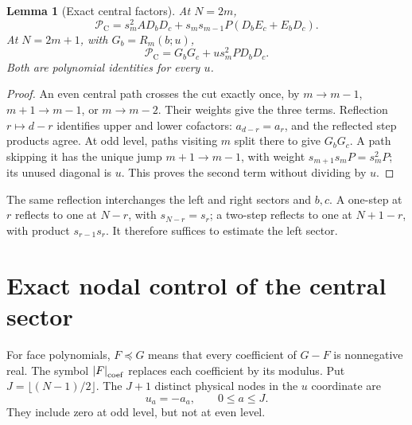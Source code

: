\documentclass[11pt]{article}
\numberwithin{equation}{section}
\newtheorem{lemma}[theorem]{Lemma}
\theoremstyle{remark}\newtheorem{remark}[theorem]{Remark}
\newcommand{\coefle}{\preccurlyeq}
\newcommand{\abscoef}[1]{\left|#1\right|_{\rm coef}}
\begin{document}
\begin{lemma}[Exact central factors]\label{lc:central-factors}
At \(N=2m\),
\begin{equation}\label{lc:even-factor}
 \mathcal P_{\mathrm C}
 =s_m^2A D_bD_c+s_ms_{m-1}P(D_bE_c+E_bD_c).
\end{equation}
At \(N=2m+1\), with \(G_b=R_m(b;u)\),
\begin{equation}\label{lc:odd-factor}
 \mathcal P_{\mathrm C}=G_bG_c+u s_m^2P D_bD_c.
\end{equation}
Both are polynomial identities for every \(u\).
\end{lemma}
\begin{proof}
An even central path crosses the cut exactly once, by \(m\to m-1\),
\(m+1\to m-1\), or \(m\to m-2\). Their weights give the three
terms. Reflection \(r\mapsto d-r\) identifies upper and lower
cofactors: \(a_{d-r}=a_r\), and the reflected step products agree.
At odd level, paths visiting \(m\) split there to give \(G_bG_c\).
A path skipping it has the unique jump \(m+1\to m-1\), with weight
\(s_{m+1}s_mP=s_m^2P\); its unused diagonal is \(u\).
This proves the second term without dividing by \(u\).
\end{proof}

The same reflection interchanges the left and right sectors and \(b,c\).
A one-step at \(r\) reflects to one at \(N-r\), with \(s_{N-r}=s_r\);
a two-step reflects to one at \(N+1-r\), with product \(s_{r-1}s_r\).
It therefore suffices to estimate the left sector.

\section{Exact nodal control of the central sector}\label{lc:nodal}
For face polynomials, \(F\coefle G\) means that every coefficient of
\(G-F\) is nonnegative real. The symbol \(\abscoef F\) replaces each
coefficient by its modulus. Put \(J=\lfloor(N-1)/2\rfloor\).
The \(J+1\) distinct physical nodes in the \(u\) coordinate are
\[
                         u_a=-a_a,\qquad 0\le a\le J.
\]
They include zero at odd level, but not at even level.
\end{document}
